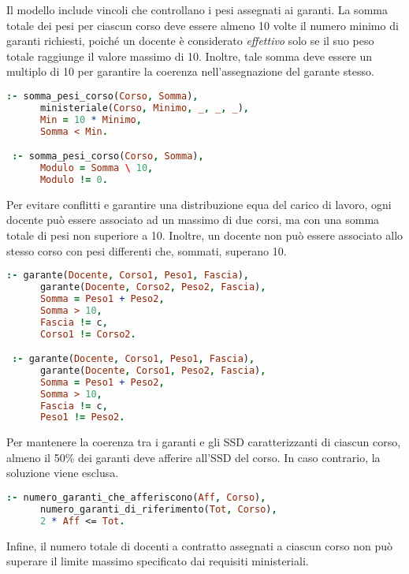 Il modello include vincoli che controllano i pesi assegnati ai garanti. La somma totale dei 
pesi per ciascun corso deve essere almeno 10 volte il numero minimo di garanti richiesti, 
poiché un docente è considerato \textit{effettivo} solo se il suo peso totale raggiunge il valore 
massimo di 10. Inoltre, tale somma deve essere un multiplo di 10 per garantire la coerenza 
nell'assegnazione del garante stesso.

\begin{lstlisting}[language=prolog, caption={Vincoli sui pesi assegnati ai garanti.}]
 :- somma_pesi_corso(Corso, Somma),
      ministeriale(Corso, Minimo, _, _, _),
      Min = 10 * Minimo,
      Somma < Min.

 :- somma_pesi_corso(Corso, Somma),
      Modulo = Somma \ 10,
      Modulo != 0.
\end{lstlisting}

Per evitare conflitti e garantire una distribuzione equa del carico di lavoro, ogni docente 
può essere associato ad un massimo di due corsi, ma con una somma totale di pesi non superiore 
a 10. Inoltre, un docente non può essere associato allo stesso corso con pesi differenti che, 
sommati, superano 10.

\begin{lstlisting}[language=prolog, caption={Vincoli sulla distribuzione dei pesi per docente.}]
 :- garante(Docente, Corso1, Peso1, Fascia),
      garante(Docente, Corso2, Peso2, Fascia),
      Somma = Peso1 + Peso2,
      Somma > 10,
      Fascia != c,
      Corso1 != Corso2.

 :- garante(Docente, Corso1, Peso1, Fascia),
      garante(Docente, Corso1, Peso2, Fascia),
      Somma = Peso1 + Peso2,
      Somma > 10,
      Fascia != c,
      Peso1 != Peso2.
\end{lstlisting}

Per mantenere la coerenza tra i garanti e gli SSD caratterizzanti di ciascun corso, almeno 
il 50\% dei garanti deve afferire all'SSD del corso. In caso contrario, la soluzione viene esclusa.

\begin{lstlisting}[language=prolog, caption={Vincolo sui garanti afferenti al SSD caratterizzante.}]
 :- numero_garanti_che_afferiscono(Aff, Corso),
      numero_garanti_di_riferimento(Tot, Corso),
      2 * Aff <= Tot.
\end{lstlisting}

Infine, il numero totale di docenti a contratto assegnati a ciascun corso non può superare il 
limite massimo specificato dai requisiti ministeriali.

